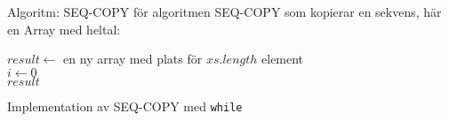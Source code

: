 \begin{Slide}{Algoritm: SEQ-COPY}
 för algoritmen SEQ-COPY som kopierar en sekvens, här en Array med heltal:\\
\noindent\hrulefill
\begin{algorithm}[H]
$result \leftarrow$ en ny array med plats för $xs.length$ element\\
$i \leftarrow 0$  \\
$result$
\end{algorithm}
\noindent\hrulefill
\end{Slide}

\begin{Slide}{Implementation av SEQ-COPY med \texttt{while}}

\end{Slide}

% 
%
% 
